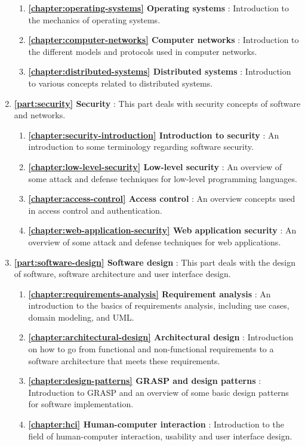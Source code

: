 \begin{enumerate}[]
		\begin{enumerate}[]
			\item \textbf{\autoref{chapter:operating-systems} Operating systems} : Introduction to the mechanics of operating systems.
			\item \textbf{\autoref{chapter:computer-networks} Computer networks} : Introduction to the different models and protocols used in computer networks.
			\item \textbf{\autoref{chapter:distributed-systems} Distributed systems} : Introduction to various concepts related to distributed systems.
		\end{enumerate}
	\item \textbf{\autoref{part:security} Security} : This part deals with security concepts of software and networks.
		\begin{enumerate}[]
			\item \textbf{\autoref{chapter:security-introduction} Introduction to security} : An introduction to some terminology regarding software security.
			\item \textbf{\autoref{chapter:low-level-security} Low-level security} : An overview of some attack and defense techniques for low-level programming languages.
			\item \textbf{\autoref{chapter:access-control} Access control} : An overview concepts used in access control and authentication.
			\item \textbf{\autoref{chapter:web-application-security} Web application security} : An overview of some attack and defense techniques for web applications.
		\end{enumerate}
	\item \textbf{\autoref{part:software-design} Software design} : This part deals with the design of software, software architecture and user interface design.
		\begin{enumerate}[]
			\item \textbf{\autoref{chapter:requirements-analysis} Requirement analysis} : An introduction to the basics of requirements analysis, including use cases, domain modeling, and UML.
			\item \textbf{\autoref{chapter:architectural-design} Architectural design} : Introduction on how to go from functional and non-functional requirements to a software architecture that meets these requirements.
			\item \textbf{\autoref{chapter:design-patterns} GRASP and design patterns} : Introduction to GRASP and an overview of some basic design patterns for software implementation.
			\item \textbf{\autoref{chapter:hci} Human-computer interaction} : Introduction to the field of human-computer interaction, usability and user interface design.
		\end{enumerate}
\end{enumerate}




